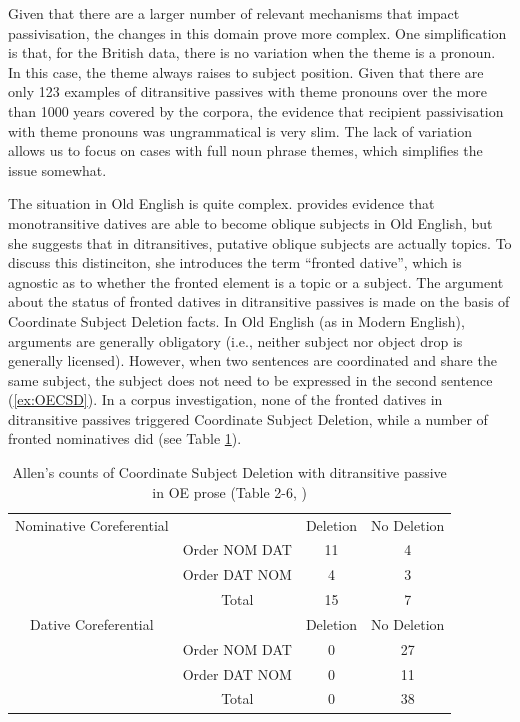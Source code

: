 	Given that there are a larger number of relevant mechanisms that impact passivisation, the changes in this domain prove more complex. One simplification is that, for the British data, there is no variation when the theme is a pronoun. In this case, the theme always raises to subject position. Given that there are only 123 examples of ditransitive passives with theme pronouns over the more than 1000 years covered by the corpora, the evidence that recipient passivisation with theme pronouns was ungrammatical is very slim. The lack of variation allows us to focus on cases with full noun phrase themes, which simplifies the issue somewhat.
	
	The situation in Old English is quite complex. \cite{Allen.1999} provides evidence that monotransitive datives are able to become oblique subjects in Old English, but she suggests that in ditransitives, putative oblique subjects are actually topics. To discuss this distinciton, she introduces the term ``fronted dative'', which is agnostic as to whether the fronted element is a topic or a subject. The argument about the status of fronted datives in ditransitive passives is made on the basis of Coordinate Subject Deletion facts. In Old English (as in Modern English), arguments are generally obligatory (i.e., neither subject nor object drop is generally licensed). However, when two sentences are coordinated and share the same subject, the subject does not need to be expressed in the second sentence (\ref{ex:OECSD}). In a corpus investigation, none of the fronted datives in ditransitive passives triggered Coordinate Subject Deletion, while a number of fronted nominatives did (see Table \ref{tab:AllenOECSD}). 

	\begin{table}[t]
		\begin{tabular}{cccc}
			Nominative Coreferential & & Deletion & No Deletion \\
			& Order NOM DAT & 11 & 4 \\
			& Order DAT NOM & 4 & 3 \\
			& Total & 15 & 7 \\
			Dative Coreferential & & Deletion & No Deletion \\
			& Order NOM DAT & 0 & 27 \\
			& Order DAT NOM & 0 & 11 \\
			& Total & 0 & 38 \\
		\end{tabular}
		\caption{Allen's counts of Coordinate Subject Deletion with ditransitive passive in OE prose (Table 2-6, \citealt{Allen.1999})}
		\label{tab:AllenOECSD}
	\end{table}

